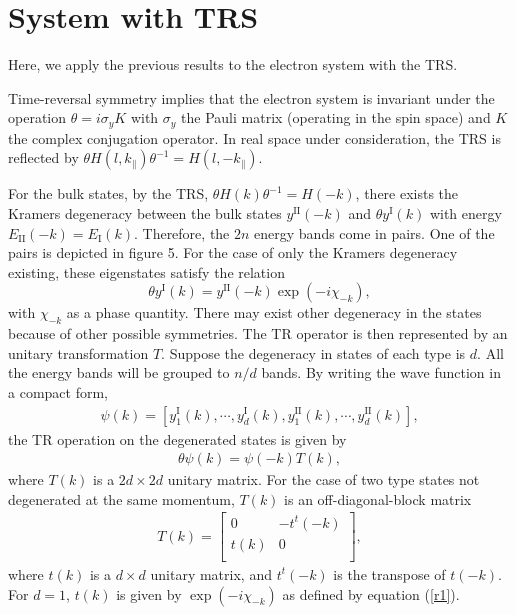\documentclass[aps,pra,amsmath,twocolumn,showpacs,bibnotes,10pt]{revtex4-1}
\begin{document}
\section{System with TRS}

Here, we apply the previous results to the electron system with the TRS. 

Time-reversal symmetry implies that the electron system is invariant under the operation $\theta = i\sigma_yK$ with $\sigma_y$ the Pauli matrix (operating in the spin space) and $K$ the complex conjugation operator. In real space under consideration, the TRS is reflected by $\theta H(l,k_{\parallel})\theta^{-1}= H(l,-k_{\parallel})$. 

For the bulk states, by the TRS, $\theta H(k)\theta^{-1} = H(-k)$, there exists the Kramers degeneracy between the bulk states $y^{\text{II}}(-k)$ and $\theta y^{\text{I}}(k)$ with energy $E_{\text{II}}(-k) = E_{\text{I}}(k)$. Therefore, the $2n$ energy bands come in pairs. One of the pairs is depicted in figure 5. For the case of only the Kramers degeneracy existing, these eigenstates satisfy the relation \cite{Fu}
\begin{equation}
\theta y^{\text{I}}(k) = y^{\text{II}}(-k) \exp(-i\chi_{-k}),  \label{r1}
\end{equation}
with $\chi_{-k}$ as a phase quantity. There may exist other degeneracy in the states because of other possible symmetries. The TR operator is then represented by an unitary transformation $T$. Suppose the degeneracy in states of each type is $d$. All the energy bands will be grouped to $n/d$ bands. By writing the wave function in a compact form, \begin{eqnarray}
\psi(k)= [y^{\text{I}}_{1}(k),\cdots,y^{\text{I}}_{d}(k),y^{\text{II}}_{1}(k),\cdots,y^{\text{II}}_{d}(k)], \nonumber
\end{eqnarray}
the TR operation on the degenerated states is given by
\begin{eqnarray}
\theta \psi(k) = \psi(-k) T(k),  \label{r2}
\end{eqnarray}
where $T(k)$ is a $2d\times 2d$ unitary matrix. For the case of two type states not degenerated at the same momentum, $T(k)$ is an off-diagonal-block matrix
\begin{eqnarray}
T(k) = \begin{bmatrix}
	0&-t^{t}(-k)\\
	t(k)&0\\
\end{bmatrix}, \label{mtt}  
\end{eqnarray}
where $t(k)$ is a $d\times d$ unitary matrix, and $t^{t}(-k)$ is the transpose of $t(-k)$. For $d = 1$, $t(k)$ is given by $\exp(-i\chi_{-k})$ as defined by equation (\ref{r1}).
\end{document}
